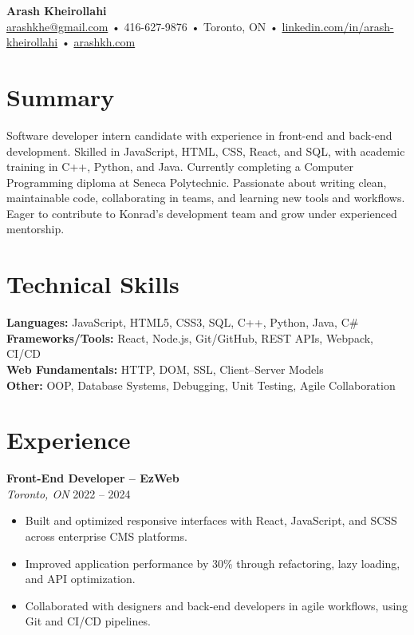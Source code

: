 \documentclass[letterpaper,10pt]{article}
\begin{document}

{\LARGE \textbf{Arash Kheirollahi}}\\
\href{mailto:arashkhe@gmail.com}{arashkhe@gmail.com} • 416-627-9876 • Toronto, ON • \href{https://linkedin.com/in/arash-kheirollahi}{linkedin.com/in/arash-kheirollahi} • \href{https://arashkh.com}{arashkh.com}

\vspace{1em}

\section*{Summary}
Software developer intern candidate with experience in front-end and back-end development. Skilled in JavaScript, HTML, CSS, React, and SQL, with academic training in C++, Python, and Java. Currently completing a Computer Programming diploma at Seneca Polytechnic. Passionate about writing clean, maintainable code, collaborating in teams, and learning new tools and workflows. Eager to contribute to Konrad’s development team and grow under experienced mentorship.

\section*{Technical Skills}
\textbf{Languages:} JavaScript, HTML5, CSS3, SQL, C++, Python, Java, C\# \\
\textbf{Frameworks/Tools:} React, Node.js, Git/GitHub, REST APIs, Webpack, CI/CD \\
\textbf{Web Fundamentals:} HTTP, DOM, SSL, Client–Server Models \\
\textbf{Other:} OOP, Database Systems, Debugging, Unit Testing, Agile Collaboration

\section*{Experience}
\textbf{Front-End Developer – EzWeb}\\
\textit{Toronto, ON} \hfill 2022 -- 2024
\begin{itemize}[leftmargin=*]
  \item Built and optimized responsive interfaces with React, JavaScript, and SCSS across enterprise CMS platforms.
  \item Improved application performance by 30\% through refactoring, lazy loading, and API optimization.
  \item Collaborated with designers and back-end developers in agile workflows, using Git and CI/CD pipelines.
\end{itemize}
\end{document}
